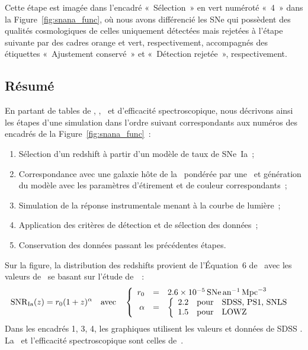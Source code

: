 \documentclass[../main/main.tex]{subfiles}
\begin{document}
Cette étape est imagée dans l'encadré «~Sélection~» en vert numéroté «~4~» dans
la Figure~\ref{fig:snana_func}, où nous avons différencié les SNe qui possèdent
des qualités cosmologiques de celles uniquement détectées
mais rejetées à l'étape suivante par des cadres orange et vert, respectivement,
accompagnés des étiquettes «~Ajustement conservé~» et «~Détection rejetée~»,
respectivement.

\subsection{Résumé}\label{ssec:simshort}

En partant de tables de \hostlib, \simlib, \wgtmap\ et d'efficacité
spectroscopique, nous décrivons ainsi les étapes d'une simulation dans l'ordre
suivant correspondants aux numéros des encadrés de la
Figure~\ref{fig:snana_func}~:
\begin{enumerate}
    \item Sélection d'un redshift à partir d'un modèle de taux de SNe~Ia~;
    \item Correspondance avec une galaxie hôte de la \hostlib\ pondérée par une
        \wgtmap\ et génération du modèle avec les paramètres d'étirement et de
        couleur correspondants~;
    \item Simulation de la réponse instrumentale menant à la courbe de lumière~;
    \item Application des critères de détection et de sélection des données~;
    \item Conservation des données passant les précédentes étapes.
\end{enumerate}
Sur la figure, la distribution des redshifts provient de l'Équation~6
de~\cite{perrett2012} avec les valeurs de~\cite{popovic2021a} se basant sur
l'étude de~\cite{scolnic2018}~:
\begin{equation}
    \mathrm{SNR}_{\rm Ia}(z) = r_0(1+z)^{\alpha}\quad\text{avec}\quad \left\{
        \begin{array}{rcl}
            r_0 & = & \SI{2.6e-5}{SNe.an^{-1}.Mpc^{-3}} \\
            \alpha & = &
            \left\{
                \begin{array}{rcl}
                    \num{2.2} & \text{pour} & \text{SDSS, PS1, SNLS}\\
                    \num{1.5} & \text{pour} & \text{LOWZ}
                \end{array}
            \right.
        \end{array}
    \right.
\end{equation}
Dans les encadrés 1, 3, 4, les graphiques utilisent les valeurs et données de
SDSS \citep{sako2018}. La \wgtmap\ et l'efficacité spectroscopique sont celles
de~\cite{popovic2021a}.
\end{document}
